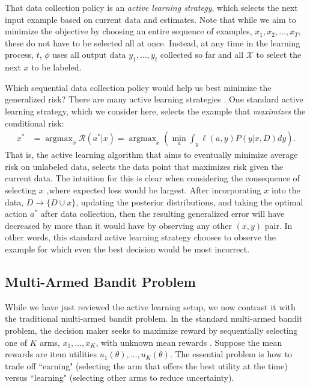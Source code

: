 \documentclass[blindrev]{informs3} %
\newcommand{\numitems}{K}
\newcommand{\risk}{\mathcal{R}}
\begin{document}
That data collection policy is an \emph{active learning strategy}, which selects the next input example based on current data and estimates. Note that while we aim to minimize the objective by choosing an entire sequence of examples, $x_1,x_2,\ldots,x_T$, these do not have to be selected all at once. Instead, at any time in the learning process, $t$, $\phi$ uses all output data $y_1,\ldots,y_t$ collected so far and all $\mathcal{X}$ to select the next $x$ to be labeled. 

Which sequential data collection policy would help us best minimize the generalized risk? There are many active learning strategies \citep{balcan2009agnostic,balcan2010true,dasgupta2008general,fu2013survey}. One standard active learning strategy, which we consider here, selects the example that \emph{maximizes} the conditional risk:
\begin{align}
x^{*}  &= \mathop{\text{arg}\max}_x \risk(a^{*}|x) 
= \mathop{\text{arg}\max}_{x} \left( \min_{a} \int_y \ell(a,y) P(y|x,D) dy \right).
\end{align}
That is, the active learning algorithm that aims to eventually minimize average risk on unlabeled data, selects the data point that maximizes risk given the current data.  The intuition for this is clear when considering the consequence of selecting $x$ ,where expected loss would be largest. After incorporating $x$ into the data, $D \to \{D \cup x \}$, updating the posterior distributions, and taking the optimal action $a^{*}$ after data collection, then the resulting generalized error will have decreased by more than it would have by observing any other $(x,y)$ pair. In other words, this standard active learning strategy chooses to observe the example for which even the best decision would be most incorrect. 


\subsection{Multi-Armed Bandit Problem}

While we have just reviewed the active learning setup, we now contrast it with the traditional multi-armed bandit problem. In the standard multi-armed bandit problem, the decision maker seeks to maximize reward by sequentially selecting one of $\numitems$ arms, $x_1,\ldots,x_\numitems$, with unknown mean rewards \citep{GittinsEtAl2011,Robbins1952,thompson1933likelihood}. Suppose the mean rewards are item utilities $u_1(\theta), \ldots, u_\numitems(\theta)$. The essential problem is how to trade off ``earning" (selecting the arm that offers the best utility at the time) versus ``learning" (selecting other arms to reduce uncertainty). 
\end{document}
